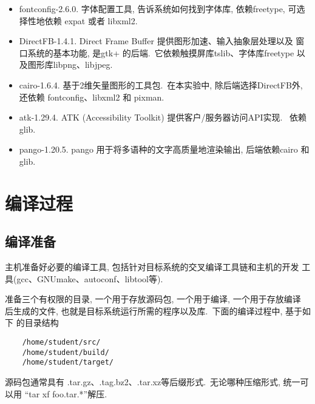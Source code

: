 \begin{itemize}
  \item fontconfig-2.6.0. 字体配置工具, 告诉系统如何找到字体库, 依赖freetype,
      可选择性地依赖 expat 或者 libxml2.

  \item DirectFB-1.4.1. Direct Frame Buffer 提供图形加速、输入抽象层处理以及
      窗口系统的基本功能, 是gtk+ 的后端.~它依赖触摸屏库tslib、字体库freetype
      以及图形库libpng、libjpeg.

  \item cairo-1.6.4. 基于2维矢量图形的工具包.~在本实验中, 除后端选择DirectFB外,
      还依赖 fontconfig、libxml2 和 pixman.
  \item atk-1.29.4. ATK (Accessibility Toolkit) 提供客户/服务器访问API实现.
      ~依赖 glib.

  \item pango-1.20.5. pango 用于将多语种的文字高质量地渲染输出, 后端依赖cairo
      和glib.
\end{itemize}

\section{编译过程}
\subsection{编译准备}
    主机准备好必要的编译工具, 包括针对目标系统的交叉编译工具链和主机的开发
工具(gcc、GNUmake、autoconf、libtool等).

    准备三个有权限的目录, 一个用于存放源码包, 一个用于编译, 一个用于存放编译
后生成的文件, 也就是目标系统运行所需的程序以及库.~下面的编译过程中, 基于如下
的目录结构

\begin{verbatim}
    /home/student/src/
    /home/student/build/
    /home/student/target/
\end{verbatim}

    源码包通常具有 .tar.gz、.tag.bz2、.tar.xz等后缀形式.~无论哪种压缩形式,
统一可以用 ``tar xf foo.tar.*''解压.

